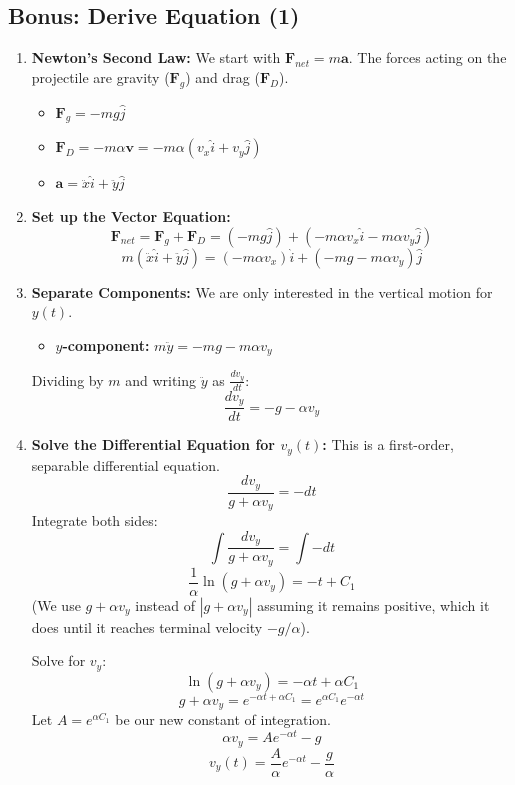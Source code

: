 \documentclass[11pt, a4paper]{article} %
\begin{document}
\hrulefill

\subsection*{Bonus: Derive Equation (1)}

\begin{enumerate}
    \item \textbf{Newton's Second Law:} We start with $\textbf{F}_{net} = m\textbf{a}$. The forces acting on the projectile are gravity ($\textbf{F}_g$) and drag ($\textbf{F}_D$).
    \begin{itemize}
        \item $\textbf{F}_g = -mg \hat{j}$
        \item $\textbf{F}_D = -m\alpha \textbf{v} = -m\alpha (v_x \hat{i} + v_y \hat{j})$
        \item $\textbf{a} = \ddot{x} \hat{i} + \ddot{y} \hat{j}$
    \end{itemize}

    \item \textbf{Set up the Vector Equation:}
    $$\textbf{F}_{net} = \textbf{F}_g + \textbf{F}_D = (-mg \hat{j}) + (-m\alpha v_x \hat{i} - m\alpha v_y \hat{j})$$
    $$m(\ddot{x} \hat{i} + \ddot{y} \hat{j}) = (-m\alpha v_x) \hat{i} + (-mg - m\alpha v_y) \hat{j}$$

    \item \textbf{Separate Components:} We are only interested in the vertical motion for $y(t)$.
    \begin{itemize}
        \item \textbf{$y$-component:} $m\ddot{y} = -mg - m\alpha v_y$
    \end{itemize}
    Dividing by $m$ and writing $\ddot{y}$ as $\frac{dv_y}{dt}$:
    $$\frac{dv_y}{dt} = -g - \alpha v_y$$

    \item \textbf{Solve the Differential Equation for $v_y(t)$:} This is a first-order, separable differential equation.
    $$\frac{dv_y}{g + \alpha v_y} = -dt$$
    Integrate both sides:
    $$\int \frac{dv_y}{g + \alpha v_y} = \int -dt$$
    $$\frac{1}{\alpha} \ln(g + \alpha v_y) = -t + C_1$$
    (We use $g + \alpha v_y$ instead of $|g + \alpha v_y|$ assuming it remains positive, which it does until it reaches terminal velocity $-g/\alpha$).
    
    Solve for $v_y$:
    $$\ln(g + \alpha v_y) = -\alpha t + \alpha C_1$$
    $$g + \alpha v_y = e^{-\alpha t + \alpha C_1} = e^{\alpha C_1} e^{-\alpha t}$$
    Let $A = e^{\alpha C_1}$ be our new constant of integration.
    $$\alpha v_y = A e^{-\alpha t} - g$$
    $$v_y(t) = \frac{A}{\alpha} e^{-\alpha t} - \frac{g}{\alpha}$$


\end{enumerate}
\end{document}
